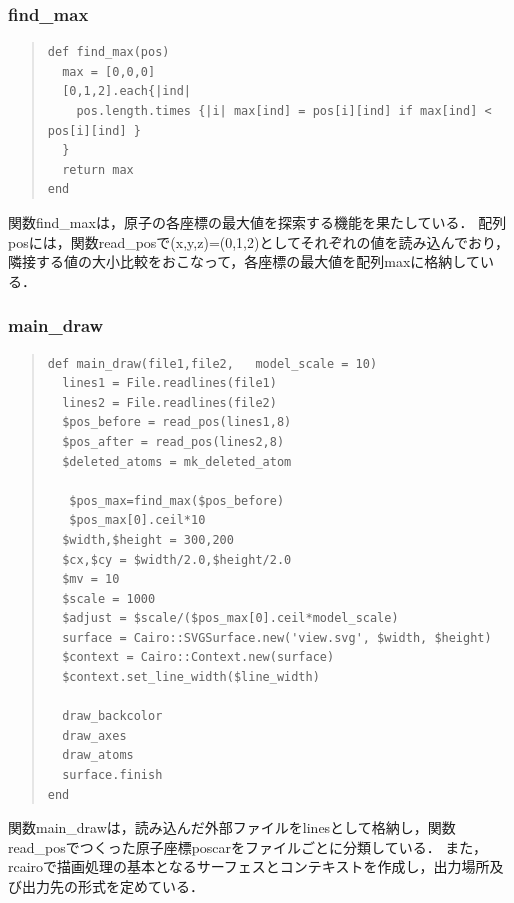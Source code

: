 \subsubsection{find\_max}\begin{quote}\begin{verbatim}
def find_max(pos)
  max = [0,0,0]
  [0,1,2].each{|ind|
    pos.length.times {|i| max[ind] = pos[i][ind] if max[ind] < pos[i][ind] }
  }
  return max
end
\end{verbatim}\end{quote}
関数find\_maxは，原子の各座標の最大値を探索する機能を果たしている．
配列posには，関数read\_posで(x,y,z)=(0,1,2)としてそれぞれの値を読み込んでおり，隣接する値の大小比較をおこなって，各座標の最大値を配列maxに格納している．

\subsubsection{main\_draw}\begin{quote}\begin{verbatim}
def main_draw(file1,file2,   model_scale = 10)
  lines1 = File.readlines(file1)
  lines2 = File.readlines(file2)
  $pos_before = read_pos(lines1,8)
  $pos_after = read_pos(lines2,8)
  $deleted_atoms = mk_deleted_atom

   $pos_max=find_max($pos_before)
   $pos_max[0].ceil*10
  $width,$height = 300,200
  $cx,$cy = $width/2.0,$height/2.0
  $mv = 10
  $scale = 1000
  $adjust = $scale/($pos_max[0].ceil*model_scale)
  surface = Cairo::SVGSurface.new('view.svg', $width, $height)
  $context = Cairo::Context.new(surface)
  $context.set_line_width($line_width)

  draw_backcolor
  draw_axes
  draw_atoms
  surface.finish
end
\end{verbatim}\end{quote}
関数main\_drawは，読み込んだ外部ファイルをlinesとして格納し，関数read\_posでつくった原子座標poscarをファイルごとに分類している．
また，rcairoで描画処理の基本となるサーフェスとコンテキストを作成し，出力場所及び出力先の形式を定めている．

